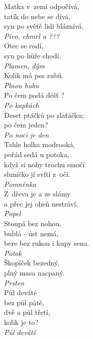 \begin{multicols}{\value{columnsthindata}}
\noindent
Matka v~zemi odpočívá,\\
tatík do nebe se dívá,\\
syn po světě lidi bláznívá.\\[1 mm]
{\sl Pivo, chmel a ???}\\

\noindent
Otec se rodí,\\
syn po hůře chodí.\\[1 mm]
{\sl Plamen, dým}\\

\noindent
Kolik má pes zubů.\\[1 mm]
{\sl Plnou hubu}\\

\noindent
Po čem padá déšť ?\\[1 mm]
{\sl Po kapkách}\\

\noindent
Deset ptáčků po zlaťáčku;\\
po čem jeden?\\[1 mm]
{\sl Po noci je den}\\

\noindent
Tahle holka modrooká,\\
pořád sedá u potoka,\\
když si nohy trochu smočí\\
sluníčko jí svítí z~očí.\\[1 mm]
{\sl Pomněnka}\\

\noindent
Z~dřeva je a ze slámy\\
a přec jej oheň nestráví.\\[1 mm]
{\sl Popel}\\

\noindent
Stoupá bez nohou,\\
bublá - úst nemá,\\
bere bez rukou i kupy sena.\\[1 mm]
{\sl Potok}\\

\noindent
Škopíček bezedný,\\
plný masa nacpaný.\\[1 mm]
{\sl Prsten}\\

\noindent
Půl deváté\\
bez půl páté,\\
dvě a půl třetí,\\
kolik je to?\\[1 mm]
{\sl Půl deváté}\\


\end{multicols}
